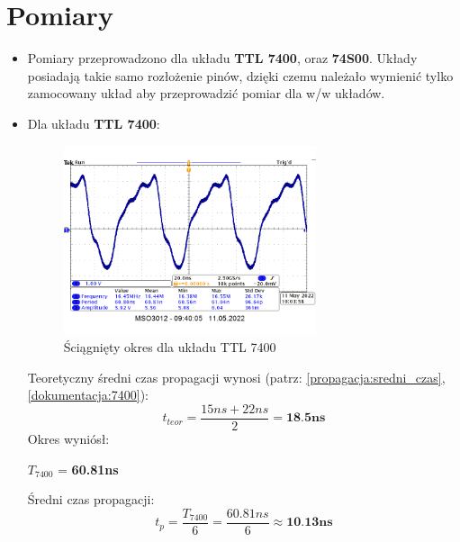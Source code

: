 \pagebreak

\section{Pomiary}

\begin{itemize}
    \item Pomiary przeprowadzono dla układu \textbf{TTL 7400}, oraz \textbf{74S00}. Układy posiadają takie samo rozłożenie pinów, dzięki czemu należało wymienić tylko zamocowany układ aby przeprowadzić pomiar dla w/w układów.
    \item Dla układu \textbf{TTL 7400}:
        \begin{figure}[H]
            \centering
            \includegraphics[width=0.7\textwidth]{img/osciloscope/4_propagacja.png}
            \caption{Ściągnięty okres dla układu TTL 7400}
            \label{propagacja:okres_7400}
        \end{figure}
        Teoretyczny średni czas propagacji wynosi (patrz: \ref{propagacja:sredni_czas}, \ref{dokumentacja:7400}):
            \begin{equation}
                t_{teor} = \dfrac{15ns + 22ns}{2} = \textbf{18.5ns}
            \end{equation}
        Okres wyniósł:
            \begin{center}
                $T_{7400}$ = \textbf{60.81ns}
            \end{center}
        Średni czas propagacji:
            \begin{equation}
                t_p = \dfrac{T_{7400}}{6} = \dfrac{60.81ns}{6} \approx \textbf{10.13ns}
            \end{equation}
           
\pagebreak
           

\end{itemize}
